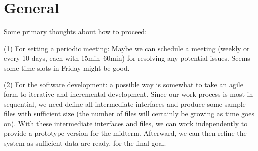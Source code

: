 \section{General}

Some primary thoughts about how to proceed:

(1) For setting a periodic meeting: Maybe we can schedule a meeting (weekly or every 10 days, each with 15min~60min) for resolving any potential issues. Seems some time slots in Friday might be good. 

(2) For the software development: a possible way is somewhat to take an agile form to iterative and incremental development. Since our work process is most in sequential, we need define all intermediate interfaces and produce some sample files with sufficient size (the number of files will certainly be growing as time goes on).  With these intermediate interfaces and files, we can work independently to provide a prototype version for the midterm. Afterward, we can then refine the system as sufficient data are ready, for the final goal.


